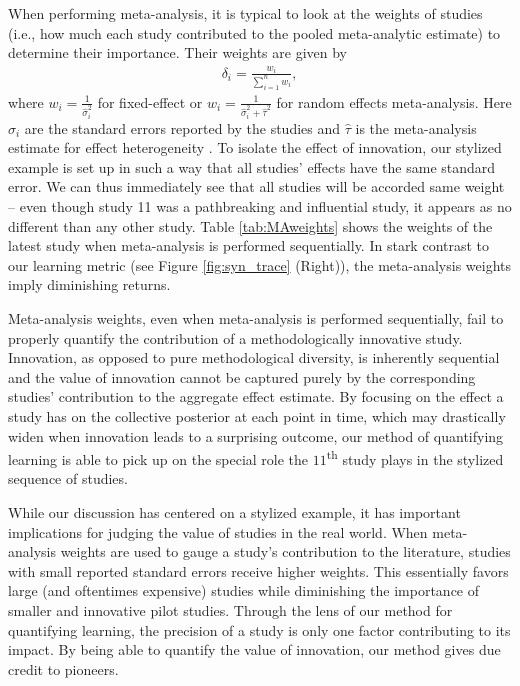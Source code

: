 When performing meta-analysis, it is typical to look at the weights of studies (i.e., how much each study contributed to the pooled meta-analytic estimate) to determine their importance. Their weights are given by 
\begin{align}\nonumber
    \delta_i = \frac{w_i}{\sum_{i=1}^n w_i},
\end{align}
where $w_i = \frac{1}{\hat \sigma_i^2}$ for fixed-effect or $w_i = \frac{1}{\hat \sigma_i^2 +\hat \tau^2}$ for random effects meta-analysis. Here   $\hat \sigma_i$ are the standard errors reported by the studies and $\hat \tau$ is the meta-analysis estimate for effect heterogeneity \citep{Higgins_Thompson_2002}. 
To isolate the effect of innovation, our stylized example is set up in such a way that all studies' effects have the same standard error. We can thus immediately see that all studies will be accorded same weight -- even though study 11 was a pathbreaking and influential study, it appears as no different than any other study. Table \ref{tab:MAweights} shows the weights of the latest study when meta-analysis is performed sequentially. In stark contrast to our learning metric (see Figure  \ref{fig:syn_trace} (Right)), the meta-analysis weights imply diminishing returns.

Meta-analysis weights, even when meta-analysis is performed sequentially, fail to properly quantify the contribution of a methodologically innovative study. Innovation, as opposed to pure methodological diversity, is inherently sequential and the value of innovation cannot be captured purely by the corresponding studies' contribution to the aggregate effect estimate. By focusing on the effect a study has on the collective posterior at each point in time, which may drastically widen when innovation leads to a surprising outcome, our method of quantifying learning is able to pick up on the special role the $11$\textsuperscript{th} study plays in the stylized sequence of studies. 

While our discussion has centered on a stylized example, it has important implications for judging the value of studies in the real world. When meta-analysis weights are used to gauge a study's contribution to the literature, studies with small reported standard errors receive higher weights. This essentially favors large (and oftentimes expensive) studies while diminishing the importance of smaller and innovative pilot studies. Through the lens of our method for quantifying learning, the precision of a study is only one factor contributing to its impact. By being able to quantify the value of innovation, our method gives due credit to pioneers. 


